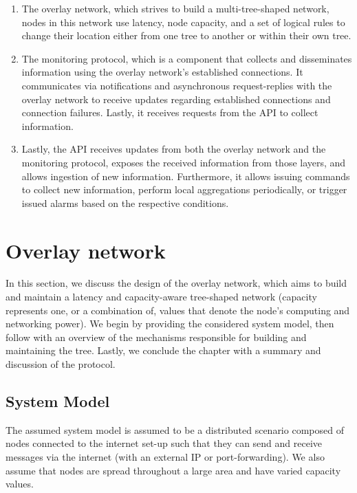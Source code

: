 \begin{enumerate}
    \item The overlay network, which strives to build a multi-tree-shaped network, nodes in this network use latency, node capacity, and a set of logical rules to change their location either from one tree to another or within their own tree.

    \item The monitoring protocol, which is a component that collects and disseminates information using the overlay network's established connections. It communicates via notifications and asynchronous request-replies with the overlay network to receive updates regarding established connections and connection failures. Lastly, it receives requests from the API to collect information.

    \item Lastly, the API receives updates from both the overlay network and the monitoring protocol, exposes the received information from those layers, and allows ingestion of new information. Furthermore, it allows issuing commands to collect new information, perform local aggregations periodically, or trigger issued alarms based on the respective conditions.
\end{enumerate}

\section{Overlay network}

In this section, we discuss the design of the overlay network, which aims to build and maintain a latency and capacity-aware tree-shaped network (capacity represents one, or a combination of, values that denote the node's computing and networking power). We begin by providing the considered system model, then follow with an overview of the mechanisms responsible for building and maintaining the tree. Lastly, we conclude the chapter with a summary and discussion of the protocol.

\subsection{System Model}

The assumed system model is assumed to be a distributed scenario composed of nodes connected to the internet set-up such that they can send and receive messages via the internet (with an external IP or port-forwarding). We also assume that nodes are spread throughout a large area and have varied capacity values.

